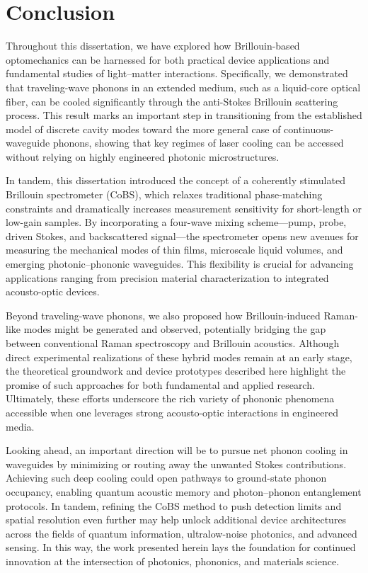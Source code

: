 \chapter{Conclusion}
\label{ch:Conclusion}
\acresetall

Throughout this dissertation, we have explored how Brillouin-based optomechanics can be harnessed for both practical device applications and fundamental studies of light–matter interactions. Specifically, we demonstrated that traveling-wave phonons in an extended medium, such as a liquid-core optical fiber, can be cooled significantly through the anti-Stokes Brillouin scattering process. This result marks an important step in transitioning from the established model of discrete cavity modes toward the more general case of continuous-waveguide phonons, showing that key regimes of laser cooling can be accessed without relying on highly engineered photonic microstructures.

In tandem, this dissertation introduced the concept of a coherently stimulated Brillouin spectrometer (CoBS), which relaxes traditional phase-matching constraints and dramatically increases measurement sensitivity for short-length or low-gain samples. By incorporating a four-wave mixing scheme—pump, probe, driven Stokes, and backscattered signal—the spectrometer opens new avenues for measuring the mechanical modes of thin films, microscale liquid volumes, and emerging photonic–phononic waveguides. This flexibility is crucial for advancing applications ranging from precision material characterization to integrated acousto-optic devices.

Beyond traveling-wave phonons, we also proposed how Brillouin-induced Raman-like modes might be generated and observed, potentially bridging the gap between conventional Raman spectroscopy and Brillouin acoustics. Although direct experimental realizations of these hybrid modes remain at an early stage, the theoretical groundwork and device prototypes described here highlight the promise of such approaches for both fundamental and applied research. Ultimately, these efforts underscore the rich variety of phononic phenomena accessible when one leverages strong acousto-optic interactions in engineered media.

Looking ahead, an important direction will be to pursue net phonon cooling in waveguides by minimizing or routing away the unwanted Stokes contributions. Achieving such deep cooling could open pathways to ground-state phonon occupancy, enabling quantum acoustic memory and photon–phonon entanglement protocols. In tandem, refining the CoBS method to push detection limits and spatial resolution even further may help unlock additional device architectures across the fields of quantum information, ultralow-noise photonics, and advanced sensing. In this way, the work presented herein lays the foundation for continued innovation at the intersection of photonics, phononics, and materials science.

\clearpage
\thispagestyle{empty}
\null
\newpage
